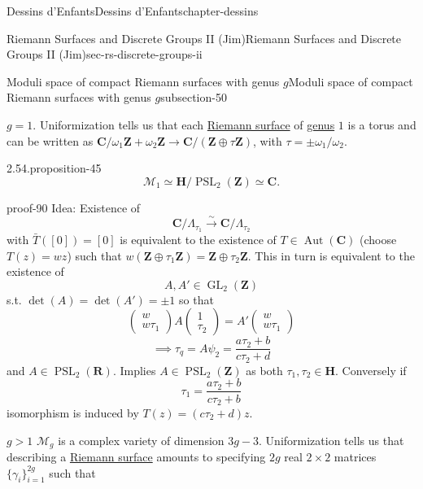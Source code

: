 \documentclass[oneside,10pt,]{book}
\numberwithin{equation}{section}
\newcommand{\lb}{[}
\newcommand{\rb}{]}
\newcommand{\ZZ}{\mathbf{Z}}
\newcommand{\RR}{\mathbf{R}}
\newcommand{\CC}{\mathbf{C}}
\newcommand{\HH}{\mathbf{H}}
\DeclareMathOperator{\Aut}{Aut}
\DeclareMathOperator{\GL}{GL}
\DeclareMathOperator{\PSL}{PSL}
\newcommand{\gt}{>}
\begin{document}
\begin{chapterptx}{Dessins d'Enfants}{}{Dessins d'Enfants}{}{}{chapter-dessins}
\begin{sectionptx}{Riemann Surfaces and Discrete Groups II (Jim)}{}{Riemann Surfaces and Discrete Groups II (Jim)}{}{}{sec-rs-discrete-groups-ii}
\begin{subsectionptx}{Moduli space of compact Riemann surfaces with genus \(g\)}{}{Moduli space of compact Riemann surfaces with genus \(g\)}{}{}{subsection-50}
\par
\hypertarget{p-574}{}%
\(g = 1\). Uniformization tells us that each \hyperref[def-top-riem-surface]{Riemann surface} of \hyperref[def-class-set]{genus} \(1\) is a torus and can be written as \(\CC/ \omega_1\ZZ+ \omega_2\ZZ \to \CC/(\ZZ \oplus \tau \ZZ)\), with \(\tau = \pm \omega_1/\omega_2\).%
\begin{proposition}{2.54.}{}{proposition-45}%
\hypertarget{p-575}{}%
%
\begin{equation*}
\mathcal M_1 \simeq \HH/ \PSL_2(\ZZ) \simeq \CC\text{.}
\end{equation*}
%
\end{proposition}
\begin{proofptx}{}{proof-90}
\hypertarget{p-576}{}%
Idea: Existence of%
\begin{equation*}
\CC/ \Lambda_{\tau_1} \xrightarrow{\sim} \CC/\Lambda_{\tau_2}
\end{equation*}
with \(\bar T (\lb 0 \rb) = \lb 0 \rb\) is equivalent to the existence of \(T \in \Aut(\CC)\) (choose \(T(z) = wz\)) such that \(w(\ZZ\oplus \tau_1 \ZZ) = \ZZ\oplus \tau_2\ZZ\). This in turn is equivalent to the existence of%
\begin{equation*}
A,A' \in \GL_2(\ZZ)
\end{equation*}
s.t. \(\det (A) = \det(A') = \pm 1\) so that%
\begin{equation*}
\begin{pmatrix} w\\ w\tau_1 \end{pmatrix} A \begin{pmatrix}1\\ \tau_2\end{pmatrix} = A' \begin{pmatrix} w \\ w\tau_1 \end{pmatrix}
\end{equation*}
%
\begin{equation*}
\implies \tau_q = A \psi_2 = \frac{a\tau_2 + b}{c\tau_2 + d}
\end{equation*}
and \(A \in \PSL_2(\RR)\). Implies \(A\in \PSL_2(\ZZ)\) as both \(\tau_1,\tau_2 \in \HH\). Conversely if%
\begin{equation*}
\tau_1 = \frac{a\tau_2 + b}{c\tau_2 + b}
\end{equation*}
isomorphism is induced by \(T(z) = (c\tau_2 + d) z\).%
\end{proofptx}
\hypertarget{p-577}{}%
\(g \gt 1\) \(\mathcal M_g\) is a complex variety of dimension \(3g-3\). Uniformization tells us that describing a \hyperref[def-top-riem-surface]{Riemann surface} amounts to specifying \(2g\) real \(2\times 2\) matrices \(\{\gamma_i\}_{i=1}^{2g}\) such that\leavevmode%

\end{subsectionptx}
\end{sectionptx}
\end{chapterptx}
\end{document}
